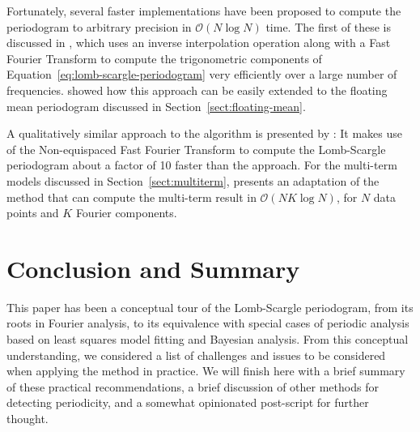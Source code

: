 \documentclass[preprint]{aastex}
\newcommand{\Eq}[1]{Equation~\ref{eq:#1}}
\newcommand{\eq}[1]{\Eq{#1}}
\newcommand{\Sect}[1]{Section~\ref{sect:#1}}
\newcommand{\sect}[1]{\Sect{#1}}
\newcommand{\sectlabel}[1]{\label{sect:#1}}
\begin{document}
Fortunately, several faster implementations have been proposed to compute the
periodogram to arbitrary precision in $\mathcal{O}(N\log N)$ time.
The first of these is discussed in \citet{Press89}, which uses an inverse
interpolation operation along with a Fast Fourier Transform to compute the
trigonometric components of \eq{lomb-scargle-periodogram} very efficiently over
a large number of frequencies.
\citet{Zechmeister09} showed how this approach can be easily extended to
the floating mean periodogram discussed in \sect{floating-mean}.

A qualitatively similar approach to the \citet{Press89} algorithm
is presented by \citet{Leroy2012}:
It makes use of the Non-equispaced Fast Fourier Transform
\citep[NFFT, see][]{Keiner2009} to compute the Lomb-Scargle periodogram about
a factor of 10 faster than the \citet{Press89} approach.
For the multi-term models discussed in \sect{multiterm}, \citet{Palmer09}
presents an adaptation of the \citet{Press89} method that can compute the
multi-term result in $\mathcal{O}(NK\log N)$, for $N$ data points and
$K$ Fourier components.


\section{Conclusion and Summary}
\sectlabel{conclusion}

This paper has been a conceptual tour of the Lomb-Scargle periodogram, from
its roots in Fourier analysis, to its equivalence with special cases of
periodic analysis based on least squares model fitting and Bayesian
analysis.
From this conceptual understanding, we considered a list of challenges
and issues to be considered when applying the method in practice.
We will finish here with a brief summary of these practical
recommendations, a brief discussion of other methods for detecting
periodicity, and a somewhat opinionated
post-script for further thought.
\end{document}
